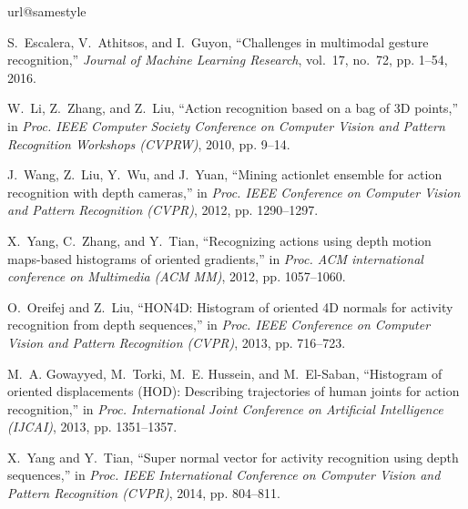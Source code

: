 \documentclass[10pt, a4paper, conference]{IEEEtran}
\begin{document}
\begin{thebibliography}{10}
\providecommand{\url}[1]{#1}
\csname url@samestyle\endcsname
\providecommand{\newblock}{\relax}
\providecommand{\bibinfo}[2]{#2}
\providecommand{\BIBentrySTDinterwordspacing}{\spaceskip=0pt\relax}
\providecommand{\BIBentryALTinterwordstretchfactor}{4}
\providecommand{\BIBentryALTinterwordspacing}{\spaceskip=\fontdimen2\font plus
\BIBentryALTinterwordstretchfactor\fontdimen3\font minus
  \fontdimen4\font\relax}
\providecommand{\BIBforeignlanguage}[2]{{\expandafter\ifx\csname l@#1\endcsname\relax
\typeout{** WARNING: IEEEtran.bst: No hyphenation pattern has been}\typeout{** loaded for the language `#1'. Using the pattern for}\typeout{** the default language instead.}\else
\language=\csname l@#1\endcsname
\fi
#2}}
\providecommand{\BIBdecl}{\relax}
\BIBdecl

S.~Escalera, V.~Athitsos, and I.~Guyon, ``Challenges in multimodal gesture
  recognition,'' \emph{Journal of Machine Learning Research}, vol.~17, no.~72,
  pp. 1--54, 2016.

W.~Li, Z.~Zhang, and Z.~Liu, ``Action recognition based on a bag of {3D}
  points,'' in \emph{Proc. IEEE Computer Society Conference on Computer Vision
  and Pattern Recognition Workshops (CVPRW)}, 2010, pp. 9--14.

J.~Wang, Z.~Liu, Y.~Wu, and J.~Yuan, ``Mining actionlet ensemble for action
  recognition with depth cameras,'' in \emph{Proc. IEEE Conference on Computer
  Vision and Pattern Recognition (CVPR)}, 2012, pp. 1290--1297.

X.~Yang, C.~Zhang, and Y.~Tian, ``Recognizing actions using depth motion
  maps-based histograms of oriented gradients,'' in \emph{Proc. ACM
  international conference on Multimedia (ACM MM)}, 2012, pp. 1057--1060.

O.~Oreifej and Z.~Liu, ``{HON4D}: Histogram of oriented {4D} normals for
  activity recognition from depth sequences,'' in \emph{Proc. IEEE Conference
  on Computer Vision and Pattern Recognition (CVPR)}, 2013, pp. 716--723.

M.~A. Gowayyed, M.~Torki, M.~E. Hussein, and M.~El-Saban, ``Histogram of
  oriented displacements ({HOD}): Describing trajectories of human joints for
  action recognition,'' in \emph{Proc. International Joint Conference on
  Artificial Intelligence (IJCAI)}, 2013, pp. 1351--1357.

X.~Yang and Y.~Tian, ``Super normal vector for activity recognition using depth
  sequences,'' in \emph{Proc. IEEE International Conference on Computer Vision
  and Pattern Recognition (CVPR)}, 2014, pp. 804--811.


\end{thebibliography}
\end{document}

